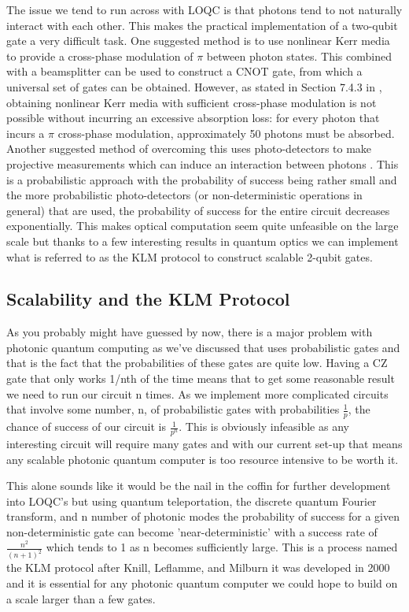 The issue we tend to run across with LOQC is that photons tend to not naturally interact with each other. This makes the practical implementation of a two-qubit gate a very difficult task. One suggested method is to use nonlinear Kerr media to provide a cross-phase modulation of $\pi$ between photon states. This combined with a beamsplitter can be used to construct a CNOT gate, from which a universal set of gates can be obtained. However, as stated in Section 7.4.3 in \cite{nielsen_chuang_2010}, obtaining nonlinear Kerr media with sufficient cross-phase modulation is not possible without incurring an excessive absorption loss: for every photon that incurs a $\pi$ cross-phase modulation, approximately 50 photons must be absorbed. Another suggested method of overcoming this uses photo-detectors to make projective measurements which can induce an interaction between photons \cite{Kok:2005jip}. This is a probabilistic approach with the probability of success being rather small and the more probabilistic photo-detectors (or non-deterministic operations in general) that are used, the probability of success for the entire circuit decreases exponentially. This makes optical computation seem quite unfeasible on the large scale but thanks to a few interesting results in quantum optics we can implement what is referred to as the KLM protocol to construct scalable 2-qubit gates.

\subsection{Scalability and the KLM Protocol}
As you probably might have guessed by now, there is a major problem with photonic quantum computing as we've discussed that uses probabilistic gates and that is the fact that the probabilities of these gates are quite low. Having a CZ gate that only works 1/nth of the time means that to get some reasonable result we need to run our circuit n times. As we implement more complicated circuits that involve some number, n, of probabilistic gates with probabilities $\frac{1}{p}$, the chance of success of our circuit is $\frac{1}{p^n}$. This is obviously infeasible as any interesting circuit will require many gates and with our current set-up that means any scalable photonic quantum computer is too resource intensive to be worth it. \par
This alone sounds like it would be the nail in the coffin for further development into LOQC's but using quantum teleportation, the discrete quantum Fourier transform, and n number of photonic modes the probability of success for a given non-deterministic gate can become 'near-deterministic' with a success rate of $\frac{n^2}{(n+1)^2}$ which tends to 1 as n becomes sufficiently large. This is a process named the KLM protocol after Knill, Leflamme, and Milburn it was developed in 2000 and it is essential for any photonic quantum computer we could hope to build on a scale larger than a few gates.

